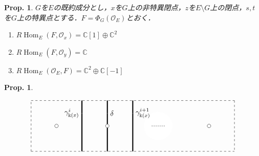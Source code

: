 \documentclass[uplatex,a4paper,11pt,dvipdfmx]{jsarticle}
\theoremstyle{mystyle} %
\newtheorem{proposition}[theorem]{Prop.}
\DeclareMathOperator{\Hom}{Hom}
\begin{document}
\begin{proposition}
	$G$を$E$の既約成分とし，$x$を$G$上の非特異閉点，$z$を$E \setminus G$上の閉点，$s,t$を$G$上の特異点とする．$F = \Phi_G(\mathcal{O}_E)$とおく．
	\begin{enumerate}
		\item $R\Hom_E(F,\mathcal{O}_x) = \mathbb{C}[1] \oplus \mathbb{C}^2$
		\item $R\Hom_E(F,\mathcal{O}_y) = \mathbb{C}$
		\item $R\Hom_E(\mathcal{O}_E, F) = \mathbb{C}^2\oplus\mathbb{C}[-1]$

	\end{enumerate}
\end{proposition}
\begin{proposition}
	\begin{figure}[h]
		\begin{displaymath}
			\begin{tikzpicture}[scale=2.5]
				\draw[dashed] (0,0)--(4,0);
				\draw[dashed] (0,0)--(0,1);
				\draw[dashed] (0,1)--(4,1);
				\draw[dashed] (4,1)--(4,0);


				\filldraw[white] (2+0.5,0.5) circle (0.275);

				\draw[dotted, thick] (2+0.5-0.125,0.5)--(2+0.5+0.125,0.5);

				\draw[line width=1.5, black] (1,0)--(1, 0.75) node[left]{$\gamma_{\Bbbk(x)}^i$};
				\draw[line width=1.5, black] (1,0.75)--(1,1);

				\draw[line width=1.5, black] (2,0)--(2, 0.75) node[right]{$\gamma_{\Bbbk(x)}^{i+1}$};
				\draw[line width=1.5, black] (2,0.75)--(2,1);

				\draw[line width=1.5, black] (1.5,0)--(1.5, 0.75) ;
				\draw[line width=1.5, black] (1.5,1)--(1.5,0.75) node[right]{$\delta$};

				\foreach \u in {0,1,3}
					{
						\filldraw[white] (\u+0.5,0.5) circle (1pt);
						\draw[black] (\u+0.5,0.5) circle (1pt);

					}
			\end{tikzpicture}
		\end{displaymath}
		\caption{}
	\end{figure}

\end{proposition}
\end{document}
